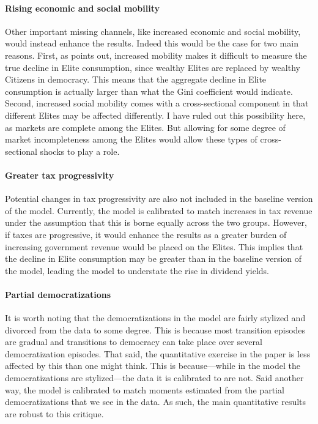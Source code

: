 \documentclass[12pt]{article}
\numberwithin{equation}{section}
\begin{document}
\paragraph{Rising economic and social mobility}
Other important missing channels, like increased economic and social mobility, would instead enhance the results. Indeed this would be the case for two main reasons. First, as \cite{Acemoglu2015} points out, increased mobility makes it difficult to measure the true decline in Elite consumption, since wealthy Elites are replaced by wealthy Citizens in democracy. This means that the aggregate decline in Elite consumption is actually larger than what the Gini coefficient would indicate. Second, increased social mobility comes with a cross-sectional component in that different Elites may be affected differently. I have ruled out this possibility here, as markets are complete among the Elites. But allowing for some degree of market incompleteness among the Elites would allow these types of cross-sectional shocks to play a role.

\paragraph{Greater tax progressivity}
Potential changes in tax progressivity are also not included in the baseline version of the model. Currently, the model is calibrated to match increases in tax revenue under the assumption that this is borne equally across the two groups. However, if taxes are progressive, it would enhance the results as a greater burden of increasing government revenue would be placed on the Elites. This implies that the decline in Elite consumption may be greater than in the baseline version of the model, leading the model to understate the rise in dividend yields.

\paragraph{Partial democratizations}
\label{par:partial_dem}
It is worth noting that the democratizations in the model are fairly stylized and divorced from the data to some degree. This is because most transition episodes are gradual and transitions to democracy can take place over several democratization episodes. That said, the quantitative exercise in the paper is less affected by this than one might think. This is because---while in the model the democratizations are stylized---the data it is calibrated to are not.  Said another way, the model is calibrated to match moments estimated from the partial democratizations that we see in the data. As such, the main quantitative results are robust to this critique.
\end{document}
